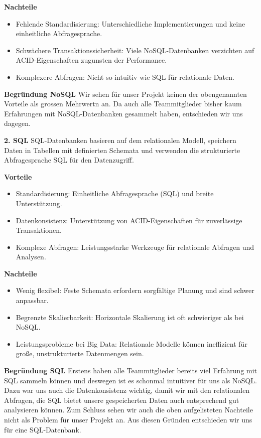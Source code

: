 \documentclass[a4paper,12pt]{report}
\begin{document}
    \textbf{Nachteile}
    \begin{itemize}
        \item Fehlende Standardisierung: Unterschiedliche Implementierungen und keine einheitliche Abfragesprache.
        \item Schwächere Transaktionssicherheit: Viele NoSQL-Datenbanken verzichten auf ACID-Eigenschaften zugunsten der Performance.
        \item Komplexere Abfragen: Nicht so intuitiv wie SQL für relationale Daten.
    \end{itemize}

    \textbf{Begründung NoSQL} Wir sehen für unser Projekt keinen der obengenannten Vorteile als grossen Mehrwertn an.
    Da auch alle Teammitglieder bisher kaum Erfahrungen mit NoSQL-Datenbanken gesammelt haben, entschieden wir uns dagegen.

    \textbf{2. SQL}
    SQL-Datenbanken basieren auf dem relationalen Modell, speichern Daten in Tabellen
    mit definierten Schemata und verwenden die strukturierte Abfragesprache SQL für den Datenzugriff.

    \textbf{Vorteile}
    \begin{itemize}
        \item Standardisierung: Einheitliche Abfragesprache (SQL) und breite Unterstützung.
        \item Datenkonsistenz: Unterstützung von ACID-Eigenschaften für zuverlässige Transaktionen.
        \item Komplexe Abfragen: Leistungsstarke Werkzeuge für relationale Abfragen und Analysen.
    \end{itemize}

    \textbf{Nachteile}
    \begin{itemize}
        \item Wenig flexibel: Feste Schemata erfordern sorgfältige Planung und sind schwer anpassbar.
        \item Begrenzte Skalierbarkeit: Horizontale Skalierung ist oft schwieriger als bei NoSQL.
        \item Leistungsprobleme bei Big Data: Relationale Modelle können ineffizient für große, unstrukturierte Datenmengen sein.
    \end{itemize}

    \textbf{Begründung SQL} Erstens haben alle Teammitglieder bereits viel Erfahrung mit SQL sammeln können und deswegen ist es schonmal intuitiver für uns als NoSQL.
    Dazu war uns auch die Datenkonsistenz wichtig, damit wir mit den relationalen Abfragen, die SQL bietet unsere gespeicherten Daten auch entsprechend gut analysieren können.
    Zum Schluss sehen wir auch die oben aufgelisteten Nachteile nicht als Problem für unser Projekt an.
    Aus diesen Gründen entschieden wir uns für eine SQL-Datenbank.
\end{document}
